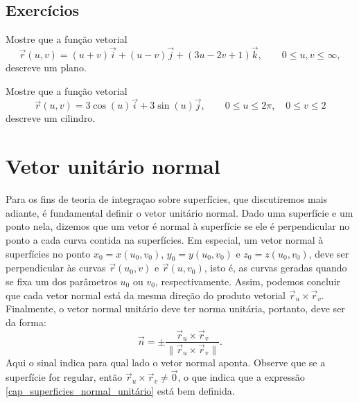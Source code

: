 \subsection*{Exercícios}
 \begin{exer}Mostre que a função vetorial
  $$
  \vec{r}(u,v)=(u+v)\vec{i}+(u-v)\vec{j}+(3u-2v+1)\vec{k}, \qquad 0\leq u,v\leq \infty,
  $$
  descreve um plano.
 \end{exer}

 \begin{exer}Mostre que a função vetorial
  $$
  \vec{r}(u,v)=3\cos(u)\vec{i}+3\sin(u)\vec{j}, \qquad 0\leq u\leq 2\pi,\quad 0\leq v\leq 2
  $$
  descreve um cilindro.
 \end{exer}
 \section{Vetor unitário normal}
Para os fins de teoria de integraçao sobre superfícies, que discutiremos mais adiante, é fundamental definir o vetor unitário normal. Dado uma superfície e um ponto nela, dizemos que um vetor é normal à superfície se ele é perpendicular no ponto a cada curva contida na superfícies. Em especial, um vetor normal à superfícies no ponto $x_0=x(u_0,v_0)$, $y_0=y(u_0,v_0)$ e $z_0=z(u_0,v_0)$, deve ser perpendicular às curvas $\vec{r}(u_0,v)$ e $\vec{r}(u,v_0)$, isto é, as curvas geradas quando se fixa um dos parâmetros $u_0$ ou $v_0$, respectivamente. Assim, podemos concluir que cada vetor normal está da mesma direção do produto vetorial $\vec{r}_u\times\vec{r}_v$. Finalmente, o vetor normal unitário deve ter norma unitária, portanto, deve ser da forma:
\begin{equation}\label{cap_superficies_normal_unitário}
 \vec{n} = \pm \frac{\vec{r}_u\times\vec{r}_v}{\|\vec{r}_u\times\vec{r}_v\|}.
\end{equation}
Aqui o sinal indica para qual lado o vetor normal aponta. Observe que se a superfície for regular, então $\vec{r}_u\times\vec{r}_v\neq \vec{0}$, o que indica que a expressão \eqref{cap_superficies_normal_unitário} está bem definida. 
